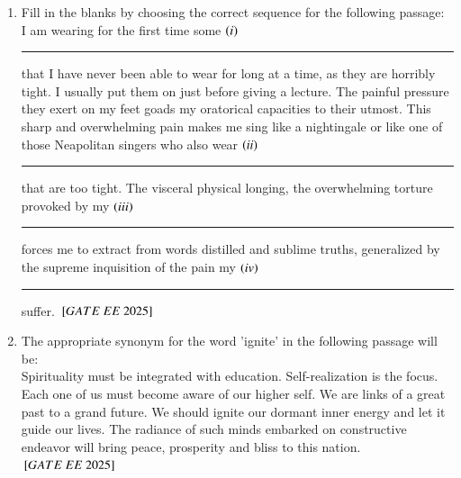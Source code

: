 \documentclass[journal,12pt,onecolumn]{IEEEtran}
\theoremstyle{remark}
\begin{document}
\begin{enumerate}
   \item Fill in the blanks by choosing the correct sequence for the following passage: \\  
 I am wearing for the first time some  $\left(i\right)$\rule{2cm}{0.4pt} that I have never been able to wear for long at a time, as they are horribly tight. I usually put them on just before giving a lecture. The painful pressure they exert on my feet goads my oratorical capacities to their utmost. This sharp and overwhelming pain makes me sing like a nightingale or like one of those Neapolitan singers who also wear  $\left(ii\right)$\rule{2cm}{0.4pt} that are too tight. The visceral physical longing, the overwhelming torture provoked by my  $\left(iii\right)$\rule{2cm}{0.4pt}  forces me to extract from words distilled and sublime truths, generalized by the supreme inquisition of the pain my  $\left(iv\right)$\rule{2cm}{0.4pt} suffer.
\hfill ${}\left[GATE\ EE\ 2025\right]$ 
    \begin{enumerate}
    \end{enumerate}
  \item The appropriate synonym for the word 'ignite' in the following passage will be: \\ 
Spirituality must be integrated with education. Self-realization is the focus. Each one of us must become aware of our higher self. We are links of a great past to a grand future. We should ignite our dormant inner energy and let it guide our lives. The radiance of such minds embarked on constructive endeavor will bring peace, prosperity and bliss to this nation.\\   
\hfill ${}\left[GATE\ EE\ 2025\right]$  
    \begin{enumerate}

\end{enumerate}
\end{enumerate}
\end{document}
